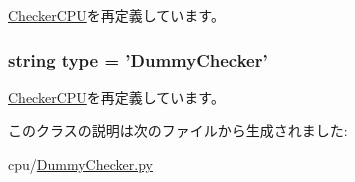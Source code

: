 \hyperlink{classCheckerCPU_1_1CheckerCPU_a17da7064bc5c518791f0c891eff05fda}{CheckerCPU}を再定義しています。\hypertarget{classDummyChecker_1_1DummyChecker_acce15679d830831b0bbe8ebc2a60b2ca}{
\subsubsection[{type}]{\setlength{\rightskip}{0pt plus 5cm}string {\bf type} = '{\bf DummyChecker}'}}
\label{classDummyChecker_1_1DummyChecker_acce15679d830831b0bbe8ebc2a60b2ca}


\hyperlink{classCheckerCPU_1_1CheckerCPU_acce15679d830831b0bbe8ebc2a60b2ca}{CheckerCPU}を再定義しています。

このクラスの説明は次のファイルから生成されました:\begin{DoxyCompactItemize}
\item 
cpu/\hyperlink{DummyChecker_8py}{DummyChecker.py}\end{DoxyCompactItemize}
